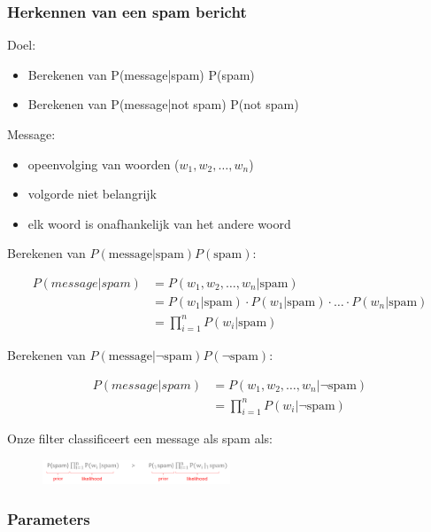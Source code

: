 \documentclass{article}
\begin{document}
\subsubsection{Herkennen van een spam bericht}

Doel:

\begin{itemize}
    \item Berekenen van P(message|spam) P(spam)
    \item Berekenen van P(message|not spam) P(not spam)
\end{itemize}

Message:

\begin{itemize}
    \item opeenvolging van woorden ($w_1, w_2, \dots, w_n$)
    \item volgorde niet belangrijk
    \item elk woord is onafhankelijk van het andere woord
\end{itemize}

Berekenen van $P(\text{message}|\text{spam}) P(\text{spam})$:

\begin{align*}
    P(message|spam) & = P(w_1, w_2, \dots, w_n | \text{spam})\\
    & = P(w_1 | \text{spam}) \cdot P(w_1 | \text{spam}) \cdot \dots \cdot P(w_n | \text{spam})\\
    & = \prod_{i=1}^n P(w_i | \text{spam})
\end{align*}

Berekenen van $P(\text{message}|\neg \text{spam}) P(\neg \text{spam})$:

\begin{align*}
    P(message|spam) & = P(w_1, w_2, \dots, w_n |\neg \text{spam})\\
    & = \prod_{i=1}^n P(w_i | \neg \text{spam})
\end{align*}

Onze filter classificeert een message als spam als:

\begin{figure}[H]
    \centering
    \includegraphics[width=0.5\textwidth]{bayes-spam2.png}
    \caption{}
\end{figure}

\subsubsection{Parameters}
\end{document}
